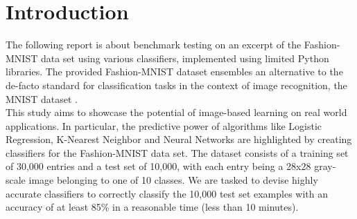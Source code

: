 \documentclass[11pt,a4paper]{article}
\begin{document}

\section*{Introduction}

\noindent The following report is about benchmark testing on an excerpt of the Fashion-MNIST data set\cite{web:fashion_mnist} using various classifiers, implemented using limited Python libraries. The provided Fashion-MNIST dataset ensembles an alternative to the de-facto standard for classification tasks in the context of image recognition, the MNIST dataset \cite{lecun-98}.\\

\noindent This study aims to showcase the potential of image-based learning on real world applications. In particular, the predictive power of algorithms like Logistic Regression, K-Nearest Neighbor and Neural Networks are highlighted by creating classifiers for the Fashion-MNIST data set. The dataset consists of a training set of 30,000 entries and a test set of 10,000, with each entry being a 28x28 gray-scale image belonging to one of 10 classes. We are tasked to devise highly accurate classifiers to correctly classify the 10,000 test set examples with an accuracy of at least 85\% in a reasonable time (less than 10 minutes).\\
\end{document}
